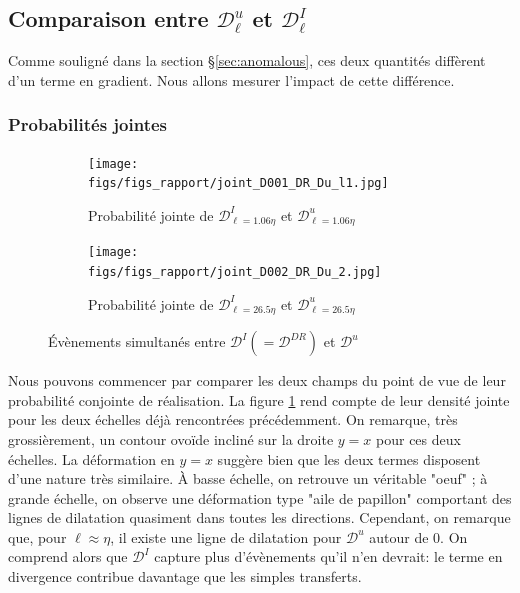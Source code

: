 \documentclass[13pt, a4paper]{extarticle}
\begin{document}
\subsection{Comparaison entre $\mathscr{D}^u_\ell$ et $\mathscr{D}^I_\ell$}
Comme souligné dans la section \S \ref{sec:anomalous}, ces deux quantités diffèrent 
d'un terme en gradient. Nous allons mesurer l'impact de cette différence.
\subsubsection{Probabilités jointes} %
\begin{figure}[H]
  \centering
  \begin{subfigure}[b]{0.48\linewidth}
  \centering
  \texttt{[image: figs/figs\_rapport/joint\_D001\_DR\_Du\_l1.jpg]}
  \caption{Probabilité jointe de $\mathscr{D}^I_{\ell=1.06\eta}$ et 
  $\mathscr{D}^u_{\ell=1.06\eta}$}
  \end{subfigure}
  \begin{subfigure}[b]{0.48\linewidth}
    \centering
    \texttt{[image: figs/figs\_rapport/joint\_D002\_DR\_Du\_2.jpg]}
    \caption{Probabilité jointe de $\mathscr{D}^I_{\ell=26.5\eta}$ et 
    $\mathscr{D}^u_{\ell=26.5\eta}$}
    \end{subfigure}
  \caption{Évènements simultanés entre $\mathscr{D}^I (=\mathscr{D}^{DR})$ et $\mathscr{D}^u$}
  \label{fig:dudr_joint}
\end{figure}
\noindent Nous pouvons commencer par comparer les deux champs du point de vue de 
leur probabilité conjointe de réalisation. La figure \ref{fig:dudr_joint} rend 
compte de leur densité jointe pour les deux échelles déjà rencontrées précédemment. 
On remarque, très grossièrement, un contour ovoïde incliné sur la droite $y=x$ pour 
ces deux échelles. La déformation en $y=x$ suggère bien que les deux termes disposent 
d'une nature très similaire.
%
À basse échelle, on retrouve un véritable "oeuf" ; à grande échelle, on observe une 
déformation type "aile de papillon" comportant des lignes de dilatation quasiment 
dans toutes les directions.  
Cependant, on remarque que, pour $\ell\approx\eta$, il existe une ligne de 
dilatation pour $\mathscr{D}^u$ autour de 0. On comprend alors que $\mathscr{D}^I$ 
capture plus d'évènements qu'il n'en devrait: le terme en divergence contribue 
davantage que les simples transferts.


\end{document}
